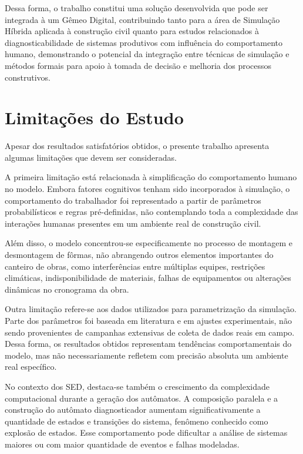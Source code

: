 Dessa forma, o trabalho constitui uma solução desenvolvida que pode ser integrada à um Gêmeo Digital, contribuindo tanto para a área de Simulação Híbrida aplicada à construção civil quanto para estudos relacionados à diagnosticabilidade de sistemas produtivos com influência do comportamento humano, demonstrando o potencial da integração entre técnicas de simulação e métodos formais para apoio à tomada de decisão e melhoria dos processos construtivos.

\section{Limitações do Estudo}

\label{sec:limitacoes}

Apesar dos resultados satisfatórios obtidos, o presente trabalho apresenta algumas limitações que devem ser consideradas.

A primeira limitação está relacionada à simplificação do comportamento humano no modelo. Embora fatores cognitivos tenham sido incorporados à simulação, o comportamento do trabalhador foi representado a partir de parâmetros probabilísticos e regras pré-definidas, não contemplando toda a complexidade das interações humanas presentes em um ambiente real de construção civil.

Além disso, o modelo concentrou-se especificamente no processo de montagem e desmontagem de fôrmas, não abrangendo outros elementos importantes do canteiro de obras, como interferências entre múltiplas equipes, restrições climáticas, indisponibilidade de materiais, falhas de equipamentos ou alterações dinâmicas no cronograma da obra.

Outra limitação refere-se aos dados utilizados para parametrização da simulação. Parte dos parâmetros foi baseada em literatura e em ajustes experimentais, não sendo provenientes de campanhas extensivas de coleta de dados reais em campo. Dessa forma, os resultados obtidos representam tendências comportamentais do modelo, mas não necessariamente refletem com precisão absoluta um ambiente real específico.

No contexto dos SED, destaca-se também o crescimento da complexidade computacional durante a geração dos autômatos. A composição paralela e a construção do autômato diagnosticador aumentam significativamente a quantidade de estados e transições do sistema, fenômeno conhecido como explosão de estados. Esse comportamento pode dificultar a análise de sistemas maiores ou com maior quantidade de eventos e falhas modeladas.

